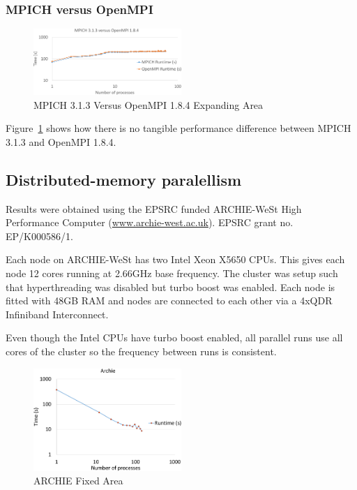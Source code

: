 \subsubsection{MPICH versus OpenMPI}

\begin{figure}
    \includegraphics[page=1,width=0.5\textwidth]
    {graphs/MPICH313-versus-OpenMPI184-crop.pdf}
    \caption{MPICH 3.1.3 Versus OpenMPI 1.8.4 Expanding Area}
    \label{fig:mpichversusopenmpiexpandingarea}
\end{figure}

Figure~\ref{fig:mpichversusopenmpiexpandingarea} shows how there is no tangible
performance difference between MPICH 3.1.3 and OpenMPI 1.8.4.

\subsection{Distributed-memory paralellism}

Results were obtained using the EPSRC funded ARCHIE-WeSt High Performance
Computer (\url{www.archie-west.ac.uk}). EPSRC grant no. EP/K000586/1.

Each node on ARCHIE-WeSt has two Intel Xeon X5650 CPUs. This gives each node 12
cores running at 2.66GHz base frequency. The cluster was setup such that
hyperthreading was disabled but turbo boost was enabled. Each node is fitted
with 48GB RAM and nodes are connected to each other via a 4xQDR Infiniband
Interconnect.

Even though the Intel CPUs have turbo boost enabled, all parallel runs use all
cores of the cluster so the frequency between runs is consistent.

\begin{figure}
    \includegraphics[page=1,width=0.5\textwidth]
    {graphs/ARCHIE-OpenMPI162-GFORTRAN482-default-mapping-fixed-area-crop.pdf}
    \caption{ARCHIE Fixed Area}
    \label{fig:archiefixedarea}
\end{figure}

